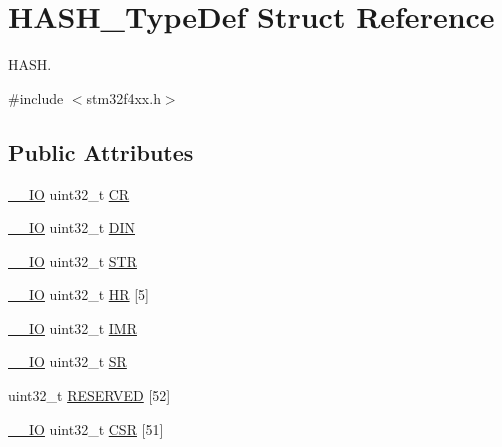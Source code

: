 \hypertarget{struct_h_a_s_h___type_def}{}\section{H\+A\+S\+H\+\_\+\+Type\+Def Struct Reference}
\label{struct_h_a_s_h___type_def}


H\+A\+SH.  




{\ttfamily \#include $<$stm32f4xx.\+h$>$}

\subsection*{Public Attributes}
\begin{DoxyCompactItemize}
\item 
\hyperlink{core__cm4_8h_aec43007d9998a0a0e01faede4133d6be}{\+\_\+\+\_\+\+IO} uint32\+\_\+t \hyperlink{struct_h_a_s_h___type_def_adba940f3265121b77f9304b1843010ea}{CR}
\item 
\hyperlink{core__cm4_8h_aec43007d9998a0a0e01faede4133d6be}{\+\_\+\+\_\+\+IO} uint32\+\_\+t \hyperlink{struct_h_a_s_h___type_def_ac4f283960465f7a1d318ed66d4b88f74}{D\+IN}
\item 
\hyperlink{core__cm4_8h_aec43007d9998a0a0e01faede4133d6be}{\+\_\+\+\_\+\+IO} uint32\+\_\+t \hyperlink{struct_h_a_s_h___type_def_a4b07bc8eb36129062d3f331921316d66}{S\+TR}
\item 
\hyperlink{core__cm4_8h_aec43007d9998a0a0e01faede4133d6be}{\+\_\+\+\_\+\+IO} uint32\+\_\+t \hyperlink{struct_h_a_s_h___type_def_acb0d3ac4cdf8c478ca0ffeebadc04840}{HR} \mbox{[}5\mbox{]}
\item 
\hyperlink{core__cm4_8h_aec43007d9998a0a0e01faede4133d6be}{\+\_\+\+\_\+\+IO} uint32\+\_\+t \hyperlink{struct_h_a_s_h___type_def_a01011d00eb28b8798af8c5dfedf6f35d}{I\+MR}
\item 
\hyperlink{core__cm4_8h_aec43007d9998a0a0e01faede4133d6be}{\+\_\+\+\_\+\+IO} uint32\+\_\+t \hyperlink{struct_h_a_s_h___type_def_a8af8c27ac134cbeb13af4e4e856de537}{SR}
\item 
uint32\+\_\+t \hyperlink{struct_h_a_s_h___type_def_a9f95e7cb8f85cae58cc429e14e96f663}{R\+E\+S\+E\+R\+V\+ED} \mbox{[}52\mbox{]}
\item 
\hyperlink{core__cm4_8h_aec43007d9998a0a0e01faede4133d6be}{\+\_\+\+\_\+\+IO} uint32\+\_\+t \hyperlink{struct_h_a_s_h___type_def_af7ae6bac0500d97592f523fdbc1e3e12}{C\+SR} \mbox{[}51\mbox{]}
\end{DoxyCompactItemize}


